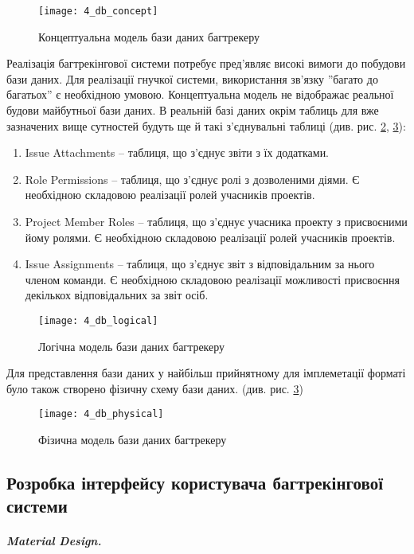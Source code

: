 \documentclass[../main.tex]{subfiles}
\begin{document}
		\begin{figure}[H]
			\centering
			\texttt{[image: 4\_db\_concept]}
			\caption{Концептуальна модель бази даних багтрекеру}
			\label{db_concept}
		\end{figure}
		
		Реалізація багтрекінгової системи потребує пред'являє високі вимоги до побудови бази даних. Для реалізації гнучкої системи, використання зв'язку ''багато до багатьох'' є необхідною умовою. Концептуальна модель не відображає реальної будови майбутньої бази даних. В реальній базі даних окрім таблиць для вже зазначених вище сутностей будуть ще й такі з'єднувальні таблиці (див. рис. \ref{db_logical}, \ref{db_physical}):
		
		\begin{enumerate}
			\item Issue Attachments -- таблиця, що з'єднує звіти з їх додатками.
			\item Role Permissions -- таблиця, що з'єднує ролі з дозволеними діями. Є необхідною складовою реалізації ролей учасників проектів.
			\item Project Member Roles -- таблиця, що з'єднує учасника проекту з присвоєними йому ролями. Є необхідною складовою реалізації ролей учасників проектів.
			\item Issue Assignments -- таблиця, що з'єднує звіт з відповідальним за нього членом команди. Є необхідною складовою реалізації можливості присвоєння декількох відповідальних за звіт осіб.
		\end{enumerate}
		
		\begin{figure}[H]
			\centering
			\texttt{[image: 4\_db\_logical]}
			\caption{Логічна модель бази даних багтрекеру}
			\label{db_logical}
		\end{figure}
		
		Для представлення бази даних у найбільш прийнятному для імплеметації форматі було також створено фізичну схему бази даних. (див. рис. \ref{db_physical})
		
		\begin{figure}[H]
			\centering
			\texttt{[image: 4\_db\_physical]}
			\caption{Фізична модель бази даних багтрекеру}
			\label{db_physical}
		\end{figure}
	
	\subsection{Розробка інтерфейсу користувача багтрекінгової системи}
		\subparagraph{Material Design.}
		
\end{document}
